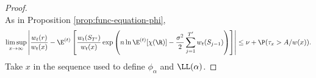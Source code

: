 \documentclass[10pt,a4paper]{article}
\begin{document}
\begin{proof}
\begin{equation}
\end{equation}
As in Proposition \ref{prop:func-equation-phi}, 
\begin{align*}
\limsup_{x\to\infty} \left| \frac{w_t(r)}{w_t(x)} - \E^{(t)}\left[ \frac{w_t(S_{T'})}{w_t(x)} \exp\left( n \ln\E^{(t)}[\chi(\R)] - \frac{\sigma^2}{2} \sum_{j=1}^{T'} w_t(S_{j-1}) \right) \right] \right| \leq \nu + \P(\tau_x>A/w(x)) .
\end{align*}
Take $x$ in the sequence used to define $\phi_\alpha$ and $\LL(\alpha)$. 


\end{proof}
\end{document}
